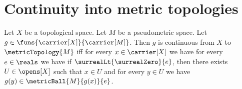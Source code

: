 \section{Continuity into metric topologies}




\begin{theorem}\label{metric_continuous_iff_local_balls}
    Let $X$ be a topological space.
    Let $M$ be a pseudometric space.
    Let $g\in\funs{\carrier[X]}{\carrier[M]}$.
    Then $g$ is continuous from $X$ to $\metricTopology{M}$ iff
        for every $x\in\carrier[X]$ we have
        for every $e\in\reals$ we have if
            $\surrealLt{\surrealZero}{e}$, then there exists
            $U\in\opens[X]$ such that $x\in U$ and
            for every $y\in U$ we have
                $g(y)\in\metricBall{M}{g(x)}{e}$.
\end{theorem}
